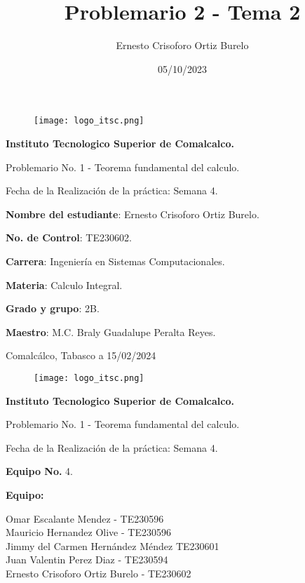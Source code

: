 \documentclass[12pt]{article}
\author{Ernesto Crisoforo Ortiz Burelo}
\title{Problemario 2 - Tema 2}
\date{05/10/2023}
\begin{document}
\hypersetup{
  linkcolor=blue,
  urlcolor=blue,
  linktoc=all
}

\begin{figure}
  \texttt{[image: logo\_itsc.png]}
\end{figure}
\centering
\fontsize{17}{50}\selectfont
\textbf{Instituto Tecnologico Superior de Comalcalco.}

\raggedright

\fontsize{16}{80}\selectfont
Problemario No. 1 -  Teorema fundamental del calculo.

\fontsize{16}{40}\selectfont
Fecha de la Realización de la práctica: Semana 4.

\fontsize{16}{40}\selectfont
\textbf{Nombre del estudiante}: Ernesto Crisoforo Ortiz Burelo.

\fontsize{16}{40}\selectfont
\textbf{No. de Control}: TE230602.

\fontsize{16}{40}\selectfont
\textbf{Carrera}: Ingeniería en Sistemas Computacionales.

\fontsize{16}{40}\selectfont
\textbf{Materia}: Calculo Integral.

\fontsize{16}{40}\selectfont
\textbf{Grado y grupo}: 2B.

\fontsize{16}{40}\selectfont
\textbf{Maestro}: M.C. Braly Guadalupe Peralta Reyes.

\raggedleft

\fontsize{15}{220}\selectfont
Comalcálco, Tabasco a 15/02/2024

\newpage

\raggedright

\begin{figure}
  \texttt{[image: logo\_itsc.png]}
\end{figure}

\centering
\fontsize{17}{50}\selectfont
\textbf{Instituto Tecnologico Superior de Comalcalco.}

\raggedright

\fontsize{16}{60}\selectfont
Problemario No. 1 -  Teorema fundamental del calculo.

\fontsize{16}{35}\selectfont
Fecha de la Realización de la práctica: Semana 4.

\fontsize{16}{35}\selectfont
\textbf{Equipo No.} 4.

\fontsize{16}{35}\selectfont
\textbf{Equipo: \\}

\fontsize{16}{25}\selectfont
Omar Escalante Mendez - TE230596 \\
Mauricio Hernandez Olive - TE230596 \\
Jimmy del Carmen Hernández Méndez TE230601 \\
Juan Valentin Perez Diaz - TE230594 \\
Ernesto Crisoforo Ortiz Burelo - TE230602
\end{document}
